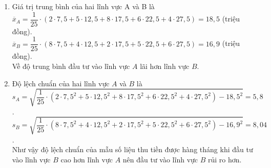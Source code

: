 \begin{ex}[Mức độ 3]
{\begin{itemize}
\begin{center}
\begin{tabular}{|p{}|c|c|c|c|c|}
					\hline
				\end{tabular}
			\end{center}
		\end{itemize}
		\begin{enumerate}
			\item Giá trị trung bình của hai lĩnh vực A và B là\\
			$ \overline{x}_{A}=\dfrac{1}{25}\cdot (2\cdot7{,}5+5\cdot12{,}5+8\cdot17{,}5+6\cdot22{,}5+4\cdot27{,}5)=18{,}5 $ (triệu đồng).\\
			$ \overline{x}_{B}=\dfrac{1}{25}\cdot (8\cdot7{,}5+4\cdot12{,}5+2\cdot17{,}5+5\cdot22{,}5+6\cdot27{,}5)=16{,}9 $ (triệu đồng).\\
			Về độ trung bình đầu tư vào lĩnh vực $A$ lãi hơn lĩnh vực $B$.
			\item Độ lệch chuẩn của hai lĩnh vực $A$ và $B$ là\\
			$ s_{A}=\sqrt{\dfrac{1}{25}\cdot (2\cdot7{,}5^{2}+5\cdot12{,}5^{2}+8\cdot17{,}5^{2}+6\cdot22{,}5^{2}+4\cdot27{,}5^{2})-18{,}5^{2}}=5{,}8 $.\\
			$ s_{B}=\sqrt{\dfrac{1}{25}\cdot (8\cdot7{,}5^{2}+4\cdot12{,}5^{2}+2\cdot17{,}5^{2}+5\cdot22{,}5^{2}+6\cdot27{,}5^{2})-16{,}9^{2}}=8{,}04 $.\\
			Như vậy độ lệch chuẩn của mẫu số liệu thu tiền được hàng tháng khi đầu tư vào lĩnh vực $B$ cao hơn lĩnh vực $A$ nên đầu tư vào lĩnh vực $B$ rủi ro hơn.
		\end{enumerate}
	}
\end{ex}

